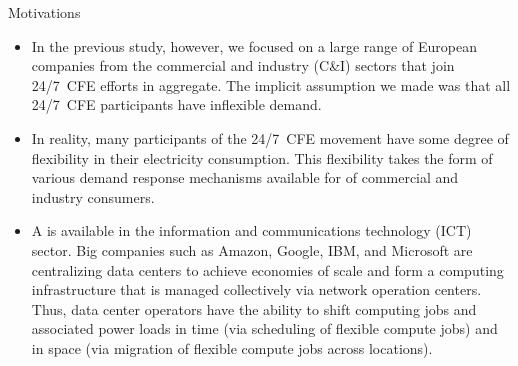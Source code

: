 \begin{frame}{Motivations}

  {\footnotesize
  \begin{itemize}
  \item In the previous study, however, we focused on a large range of European companies from the commercial and industry (C\&I) sectors that join 24/7~CFE efforts in aggregate. The implicit assumption we made was that all 24/7~CFE participants have \alert{inflexible demand}.
  
  \item In reality, many participants of the 24/7~CFE movement have some degree of flexibility in their electricity consumption. This flexibility takes the form of various demand response mechanisms available for  of commercial and industry consumers.

  \item  A  is available in the information and communications technology (ICT) sector. Big companies such as Amazon, Google, IBM, and Microsoft are centralizing data centers to achieve economies of scale and form a computing infrastructure that is managed collectively via network operation centers. Thus, data center operators have the ability to \alert{shift computing jobs and associated power loads} in time (via scheduling of flexible compute jobs) and in space (via migration of flexible compute jobs across locations). 
  \end{itemize}

  }

\end{frame}
  

